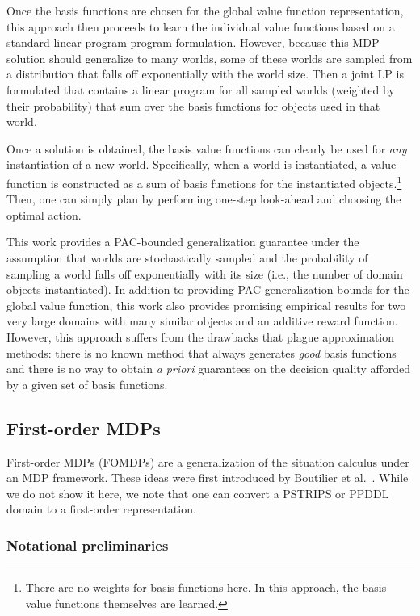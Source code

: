 Once the basis functions are chosen for the global value function representation,
this approach then proceeds to learn the individual value
functions based on a standard linear program program formulation.
However, because this MDP solution should generalize to many worlds,
some of these worlds are sampled from a distribution that falls off
exponentially with the world size.  Then a joint LP is formulated that
contains a linear program for all sampled worlds (weighted by their
probability) that sum over the basis functions for objects 
used in that world.

Once a solution is obtained, the basis value functions can clearly be used for
\emph{any} instantiation of a new world.  Specifically, when a world is
instantiated, a value function is constructed as a sum of basis
functions for the instantiated objects.\footnote{There are no weights
for basis functions here.  In this approach, the basis value functions
themselves are learned.}  Then, one can simply plan by performing
one-step look-ahead and choosing the optimal action.

This work provides a PAC-bounded generalization guarantee
under the assumption that worlds are stochastically sampled and the
probability of sampling a world falls off exponentially with its size
(i.e., the number of domain objects instantiated).  
In addition to providing PAC-generalization bounds for the global value
function, this work also provides promising empirical results for two
very large domains with many similar objects and an additive reward
function.  However, this approach
suffers from the drawbacks that plague approximation methods: there is 
no known method that always generates \emph{good} basis functions and there
is no way to obtain \emph{a priori} guarantees on the decision quality
afforded by a given set of basis functions.

\subsection{First-order MDPs}

First-order MDPs (FOMDPs) are a generalization of the situation calculus under
an MDP framework.  These ideas were first introduced by Boutilier et
al.~\cite{fomdp}.  While we do not show it here, we note that one can
convert a PSTRIPS or PPDDL domain to a first-order
representation.

\subsubsection{Notational preliminaries}

